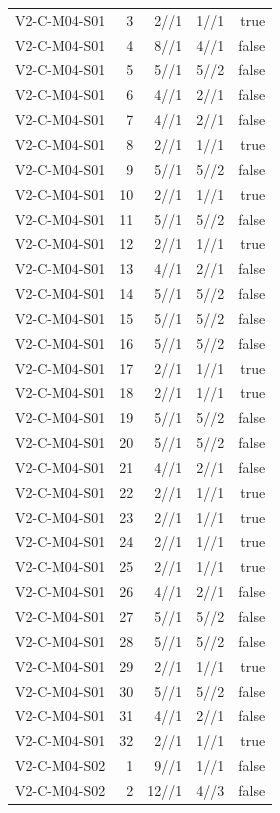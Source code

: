 {\begin{longtable}{lrrrr}
V2-C-M04-S01 & 3 & 2//1 & 1//1 & true \\
V2-C-M04-S01 & 4 & 8//1 & 4//1 & false \\
V2-C-M04-S01 & 5 & 5//1 & 5//2 & false \\
V2-C-M04-S01 & 6 & 4//1 & 2//1 & false \\
V2-C-M04-S01 & 7 & 4//1 & 2//1 & false \\
V2-C-M04-S01 & 8 & 2//1 & 1//1 & true \\
V2-C-M04-S01 & 9 & 5//1 & 5//2 & false \\
V2-C-M04-S01 & 10 & 2//1 & 1//1 & true \\
V2-C-M04-S01 & 11 & 5//1 & 5//2 & false \\
V2-C-M04-S01 & 12 & 2//1 & 1//1 & true \\
V2-C-M04-S01 & 13 & 4//1 & 2//1 & false \\
V2-C-M04-S01 & 14 & 5//1 & 5//2 & false \\
V2-C-M04-S01 & 15 & 5//1 & 5//2 & false \\
V2-C-M04-S01 & 16 & 5//1 & 5//2 & false \\
V2-C-M04-S01 & 17 & 2//1 & 1//1 & true \\
V2-C-M04-S01 & 18 & 2//1 & 1//1 & true \\
V2-C-M04-S01 & 19 & 5//1 & 5//2 & false \\
V2-C-M04-S01 & 20 & 5//1 & 5//2 & false \\
V2-C-M04-S01 & 21 & 4//1 & 2//1 & false \\
V2-C-M04-S01 & 22 & 2//1 & 1//1 & true \\
V2-C-M04-S01 & 23 & 2//1 & 1//1 & true \\
V2-C-M04-S01 & 24 & 2//1 & 1//1 & true \\
V2-C-M04-S01 & 25 & 2//1 & 1//1 & true \\
V2-C-M04-S01 & 26 & 4//1 & 2//1 & false \\
V2-C-M04-S01 & 27 & 5//1 & 5//2 & false \\
V2-C-M04-S01 & 28 & 5//1 & 5//2 & false \\
V2-C-M04-S01 & 29 & 2//1 & 1//1 & true \\
V2-C-M04-S01 & 30 & 5//1 & 5//2 & false \\
V2-C-M04-S01 & 31 & 4//1 & 2//1 & false \\
V2-C-M04-S01 & 32 & 2//1 & 1//1 & true \\
V2-C-M04-S02 & 1 & 9//1 & 1//1 & false \\
V2-C-M04-S02 & 2 & 12//1 & 4//3 & false \\

\end{longtable}}
